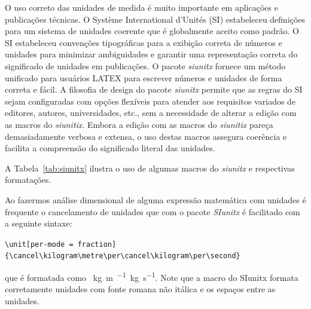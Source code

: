 {O uso correto das unidades de medida é muito importante em aplicações e publicações técnicas. O Système International d'Unités (SI)  estabeleceu definições para um sistema de unidades coerente que é globalmente aceito como padrão.  O SI estabeleceu convenções tipográficas para a exibição correta de números e unidades  para minimizar ambiguidades e garantir uma representação correta do significado de unidades em publicações.
O pacote \emph{siunitx}  fornece um método unificado para usuários LATEX para escrever números e unidades de forma correta e fácil. A filosofia de design do pacote \emph{siunitx} permite que as regras do SI sejam  configuradas com opções  flexíveis para atender aos requisitos variados de editores, autores, universidades, etc., sem a necessidade de alterar a edição com as macros  do \emph{siunitix}. Embora a edição com as macros do \emph{siunitix} pareça demasiadamente verbosa e extensa, o uso destas macros  assegura coerência e facilita a compreensão do significado literal das unidades. 

A Tabela~\ref{tab:siunitx} ilustra o uso de algumas macros do \emph{siunitx} e respectivas formatações. 

Ao fazermos análise dimensional de alguma expressão matemática com unidades é frequente  o cancelamento de unidades que com o pacote \emph{SIunitx}  é facilitado com a seguinte sintaxe:

\verb|\unit[per-mode = fraction] {\cancel\kilogram\metre\per\cancel\kilogram\per\second} | 

que é formatada como  \unit[per-mode = fraction] {\cancel\kilogram\metre\per\cancel\kilogram\per\second}. Note que a macro do SIunitx  formata corretamente unidades com fonte romana não itálica e os espaços entre as unidades.

}
